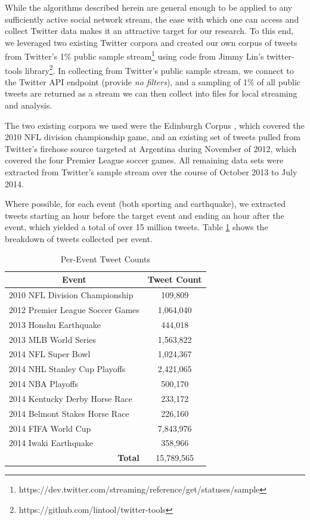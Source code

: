 \documentclass[letterpaper]{article}
\begin{document}
While the algorithms described herein are general enough to be applied to any sufficiently active social network stream, the ease with which one can access and collect Twitter data makes it an attractive target for our research.
To this end, we leveraged two existing Twitter corpora and created our own corpus of tweets from Twitter's 1\% public sample stream\footnote{https://dev.twitter.com/streaming/reference/get/statuses/sample} using code from Jimmy Lin's twitter-tools library\footnote{https://github.com/lintool/twitter-tools}.
In collecting from Twitter's public sample stream, we connect to the Twitter API endpoint (provide \emph{no filters}), and a sampling of 1\% of all public tweets are returned as a stream we can then collect into files for local streaming and analysis.

The two existing corpora we used were the Edinburgh Corpus \cite{Petrovic:2010:ETC:1860667.1860680}, which covered the 2010 NFL division championship game, and an existing set of tweets pulled from Twitter's firehose source targeted at Argentina during November of 2012, which covered the four Premier League soccer games.
All remaining data sets were extracted from Twitter's sample stream over the course of October 2013 to July 2014.

Where possible, for each event (both sporting and earthquake), we extracted tweets starting an hour before the target event and ending an hour after the event, which yielded a total of over 15 million tweets.
Table \ref{tab:tweetCounts} shows the breakdown of tweets collected per event.

\begin{table}[htdp]
\footnotesize
\caption{Per-Event Tweet Counts}
\begin{center}
\begin{tabular}{|p{2in}|c|}
\hline
\multicolumn{1}{|c|}{\textbf{Event}} & \textbf{Tweet Count} \\ \hline
2010 NFL Division Championship & 109,809 \\ \hline
2012 Premier League Soccer Games & 1,064,040 \\ \hline
2013 Honshu Earthquake  & 444,018 \\ \hline
2013 MLB World Series  & 1,563,822 \\ \hline
2014 NFL Super Bowl & 1,024,367 \\ \hline
2014 NHL Stanley Cup Playoffs & 2,421,065 \\ \hline
2014 NBA Playoffs & 500,170 \\ \hline
2014 Kentucky Derby Horse Race & 233,172 \\ \hline
2014 Belmont Stakes Horse Race & 226,160 \\ \hline
2014 FIFA World Cup & 7,843,976 \\ \hline
2014 Iwaki Earthquake  & 358,966 \\ \hline
\multicolumn{1}{|r|}{\textbf{Total}} &  15,789,565  \\ \hline
\end{tabular}
\end{center}
\label{tab:tweetCounts}
\end{table}
\end{document}
